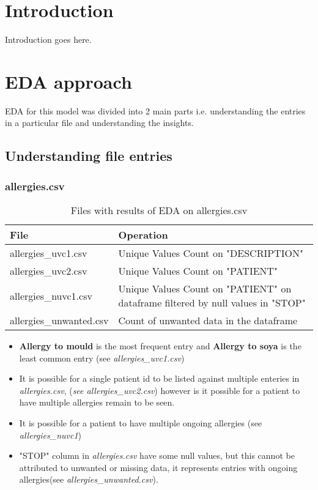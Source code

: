 \documentclass[12pt, twosided]{report}  %
\begin{document}
\pagebreak

\section{Introduction}
Introduction goes here.

\section{EDA approach}
EDA for this model was divided into 2 main parts i.e. understanding the entries in a particular file and understanding the insights.
 
\subsection{Understanding file entries}

\subsubsection{allergies.csv}


\begin{table}[H]
	\begin{tabular}{p{4cm}|p{15cm}}
		\textbf{File}           & \textbf{Operation} \\ \hline
		allergies\_uvc1.csv     & Unique Values Count on "DESCRIPTION"   \\
		allergies\_uvc2.csv     & Unique Values Count on "PATIENT"  \\
		allergies\_nuvc1.csv    & Unique Values Count on "PATIENT" on dataframe filtered by null   values in "STOP"   \\
		allergies\_unwanted.csv & Count of unwanted data in the dataframe  \\
	\end{tabular}
	\caption{Files with results of EDA on allergies.csv}
\end{table}

\begin{itemize}
	\item \textbf{Allergy to mould} is the most frequent entry and \textbf{Allergy to soya} is the least common entry (see \textit{allergies\_uvc1.csv})
	
	\item It is possible for a single patient id to be listed against multiple enteries in \textit{allergies.csv}, (\textit{see allergies\_uvc2.csv}) however is it possible for a patient to have multiple allergies remain to be seen.
	
	\item It is possible for a patient to have multiple ongoing allergies (see \textit{allergies\_nuvc1})
	
	\item "STOP" column in \textit{allergies.csv} have some null values, but this cannot be attributed to unwanted or missing data, it represents entries with ongoing allergies(see \textit{allergies\_unwanted.csv}).
	
\end{itemize}
\end{document}
